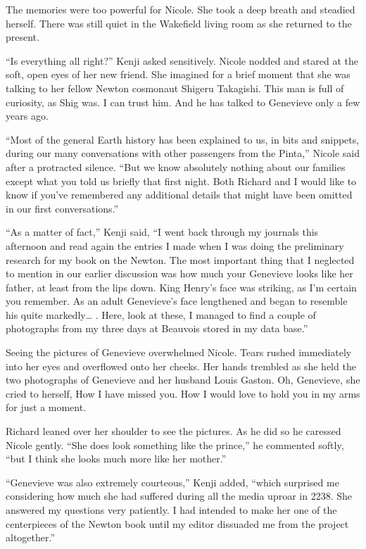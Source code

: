 \documentclass[]{article}
\begin{document}
{The memories were too powerful for Nicole.  She took a deep breath and steadied herself.  There was still quiet in the Wakefield living room as she returned to the present.

“Is everything all right?” Kenji asked sensitively.  Nicole nodded and stared at the soft, open eyes of her new friend.  She imagined for a brief moment that she was talking to her fellow Newton cosmonaut Shigeru Takagishi.  This man is full of curiosity, as Shig was.  I can trust him.  And he has talked to Genevieve only a few years ago.

“Most of the general Earth history has been explained to us, in bits and snippets, during our many conversations with other passengers from the Pinta,” Nicole said after a protracted silence.  “But we know absolutely nothing about our families except what you told us briefly that first night.  Both Richard and I would like to know if you’ve remembered any additional details that might have been omitted in our first conversations.”

“As a matter of fact,” Kenji said, “I went back through my journals this afternoon and read again the entries I made when I was doing the preliminary research for my book on the Newton.  The most important thing that I neglected to mention in our earlier discussion was how much your Genevieve looks like her father, at least from the lips down.  King Henry’s face was striking, as I’m certain you remember.  As an adult Genevieve’s face lengthened and began to resemble his quite markedly… .  Here, look at these, I managed to find a couple of photographs from my three days at Beauvois stored in my data base.”

Seeing the pictures of Genevieve overwhelmed Nicole.  Tears rushed immediately into her eyes and overflowed onto her cheeks.  Her hands trembled as she held the two photographs of Genevieve and her husband Louis Gaston.  Oh, Genevieve, she cried to herself, How I have missed you.  How I would love to hold you in my arms for just a moment.

Richard leaned over her shoulder to see the pictures.  As he did so he caressed Nicole gently.  “She does look something like the prince,” he commented softly, “but I think she looks much more like her mother.”

“Genevieve was also extremely courteous,” Kenji added, “which surprised me considering how much she had suffered during all the media uproar in 2238.  She answered my questions very patiently.  I had intended to make her one of the centerpieces of the Newton book until my editor dissuaded me from the project altogether.”

}
\end{document}
